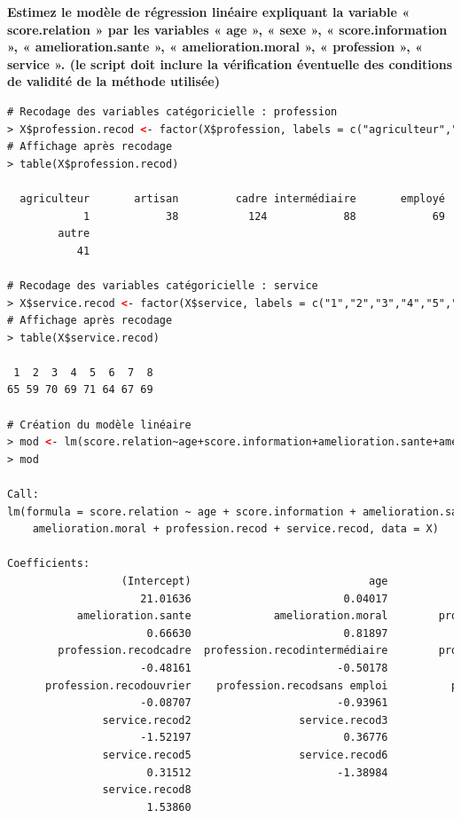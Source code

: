 \textbf{Estimez le modèle de régression linéaire expliquant la variable « score.relation » par les variables « age », « sexe », « score.information », « amelioration.sante », « amelioration.moral », « profession »,  « service ». (le script doit inclure la vérification éventuelle des conditions de validité de la méthode utilisée)}

\begin{lstlisting}[language=html]
# Recodage des variables catégoricielle : profession
> X$profession.recod <- factor(X$profession, labels = c("agriculteur","artisan","cadre","intermédiaire","employé","ouvrier","sans emploi","autre"))
# Affichage après recodage
> table(X$profession.recod)

  agriculteur       artisan         cadre intermédiaire       employé       ouvrier   sans emploi 
            1            38           124            88            69            44            22 
        autre 
           41 

# Recodage des variables catégoricielle : service 
> X$service.recod <- factor(X$service, labels = c("1","2","3","4","5","6","7","8"))
# Affichage après recodage
> table(X$service.recod)

 1  2  3  4  5  6  7  8 
65 59 70 69 71 64 67 69 

# Création du modèle linéaire
> mod <- lm(score.relation~age+score.information+amelioration.sante+amelioration.moral+profession.recod+service.recod,data=X)
> mod

Call:
lm(formula = score.relation ~ age + score.information + amelioration.sante + 
    amelioration.moral + profession.recod + service.recod, data = X)

Coefficients:
                  (Intercept)                            age              score.information  
                     21.01636                        0.04017                        0.28004  
           amelioration.sante             amelioration.moral        profession.recodartisan  
                      0.66630                        0.81897                        0.66002  
        profession.recodcadre  profession.recodintermédiaire        profession.recodemployé  
                     -0.48161                       -0.50178                        1.09986  
      profession.recodouvrier    profession.recodsans emploi          profession.recodautre  
                     -0.08707                       -0.93961                        0.52937  
               service.recod2                 service.recod3                 service.recod4  
                     -1.52197                        0.36776                        0.59523  
               service.recod5                 service.recod6                 service.recod7  
                      0.31512                       -1.38984                        0.58465  
               service.recod8  
                      1.53860  


\end{lstlisting}
